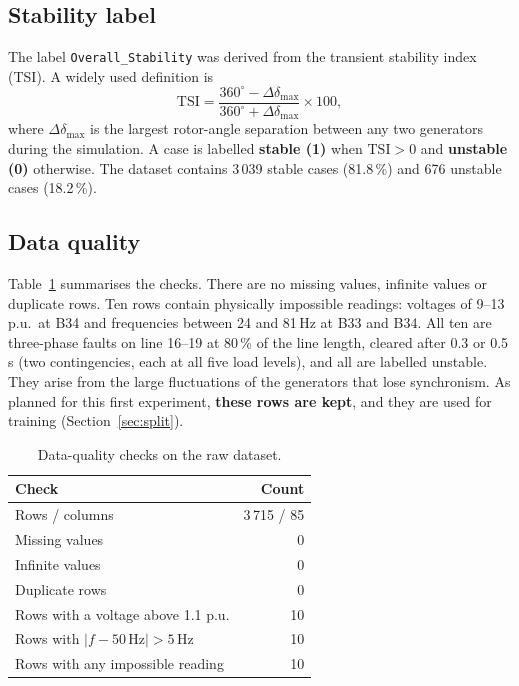 \documentclass[11pt,a4paper]{article}
\newcommand{\code}[1]{\texttt{#1}}
\begin{document}
\subsection{Stability label}
The label \code{Overall\_Stability} was derived from the transient stability index (TSI). A widely used definition is
\begin{equation}
  \mathrm{TSI} = \frac{360^\circ - \Delta\delta_{\max}}{360^\circ + \Delta\delta_{\max}} \times 100,
  \label{eq:tsi}
\end{equation}
where $\Delta\delta_{\max}$ is the largest rotor-angle separation between any two generators during the simulation.
A case is labelled \textbf{stable (1)} when $\mathrm{TSI} > 0$ and \textbf{unstable (0)} otherwise.
The dataset contains 3\,039 stable cases (81.8\,\%) and 676 unstable cases (18.2\,\%).

\subsection{Data quality}
Table~\ref{tab:quality} summarises the checks. There are no missing values, infinite values or duplicate rows.
Ten rows contain physically impossible readings: voltages of 9--13\,p.u.\ at B34 and frequencies between 24 and
81\,Hz at B33 and B34. All ten are three-phase faults on line 16--19 at 80\,\% of the line length, cleared after 0.3
or 0.5\,s (two contingencies, each at all five load levels), and all are labelled unstable. They arise from the large
fluctuations of the generators that lose synchronism. As planned for this first experiment, \textbf{these rows are
kept}, and they are used for training (Section~\ref{sec:split}).

\begin{table}[htbp]
\centering
\caption{Data-quality checks on the raw dataset.}
\label{tab:quality}
\begin{tabular}{lr}
\toprule
Check & Count \\
\midrule
Rows / columns                              & 3\,715 / 85 \\
Missing values                              & 0 \\
Infinite values                             & 0 \\
Duplicate rows                              & 0 \\
Rows with a voltage above 1.1 p.u.          & 10 \\
Rows with $|f - 50\,\mathrm{Hz}| > 5$\,Hz   & 10 \\
Rows with any impossible reading            & 10 \\
\bottomrule
\end{tabular}
\end{table}
\end{document}
